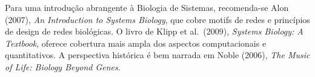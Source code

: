 Para uma introdução abrangente à Biologia de Sistemas, recomenda-se Alon (2007),
\textit{An Introduction to Systems Biology}, que cobre motifs de redes e princípios
de design de redes biológicas. O livro de Klipp et al.\ (2009),
\textit{Systems Biology: A Textbook}, oferece cobertura mais ampla dos aspectos
computacionais e quantitativos. A perspectiva histórica é bem narrada em
Noble (2006), \textit{The Music of Life: Biology Beyond Genes}.
